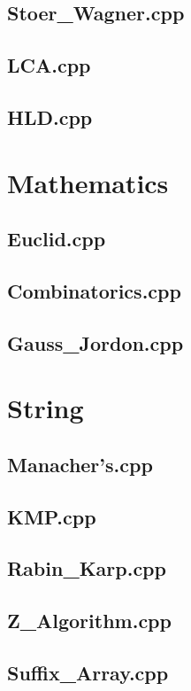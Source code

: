 \subsection{Stoer\_Wagner.cpp}

\subsection{LCA.cpp}

\subsection{HLD.cpp}

\section{Mathematics}
\subsection{Euclid.cpp}

\subsection{Combinatorics.cpp}

\subsection{Gauss\_Jordon.cpp}

\section{String}
\subsection{Manacher's.cpp}

\subsection{KMP.cpp}

\subsection{Rabin\_Karp.cpp}

\subsection{Z\_Algorithm.cpp}

\subsection{Suffix\_Array.cpp}

